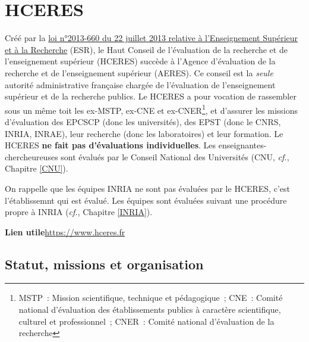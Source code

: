 
\chapter[HCERES]{HCERES} \label{HCERES}


Cr\'e\'e par la \href{https://www.legifrance.gouv.fr/loda/id/JORFTEXT000027735009}{loi n°2013-660 du 22 juillet 2013 relative \`a l'Enseignement Sup\'erieur et \`a la Recherche} (ESR), le Haut Conseil de l'\'evaluation de la recherche et de l'enseignement sup\'erieur (HCERES) succ\`ede \`a l'Agence d'\'evaluation de la recherche et de l'enseignement sup\'erieur (AERES). Ce conseil est la {\em seule} autorit\'e administrative fran\c caise
charg\'ee de l'\'evaluation de l'enseignement sup\'erieur et de la recherche publics.
Le HCERES a pour vocation de rassembler sous un m\^eme toit les ex-MSTP, ex-CNE
et ex-CNER\footnote{%
MSTP~: Mission scientifique, technique et p\'edagogique~;
CNE~: Comit\'e national d'\'evaluation
des \'etablissements publics \`a caract\`ere scientifique, culturel et
professionnel~;
CNER~: Comit\'e national d'\'evaluation de la recherche},
et d'assurer les missions d'\'evaluation des EPCSCP (donc les universit\'es), des EPST (donc le CNRS, INRIA, INRAE),
leur recherche (donc les laboratoires) et leur formation. Le HCERES \textbf{ne fait pas d'\'evaluations individuelles}. Les enseignant\mp e\mp s-chercheur\mp euse\mp s sont évalués par le Conseil National des Universit\'es (CNU, {\em cf.}, Chapitre \ref{CNU}). 

On rappelle que les \'equipes INRIA ne sont pas \'evalu\'ees par le HCERES, c'est l'\'etablissemnt qui est \'evalu\'e. 
Les \'equipes sont \'evalu\'ees suivant une proc\'edure propre \`a INRIA ({\em cf.}, Chapitre \ref{INRIA}). 

\textbf{Lien utile\hspace{0.5em}}\url{https://www.hceres.fr}


\section{Statut, missions et organisation}

